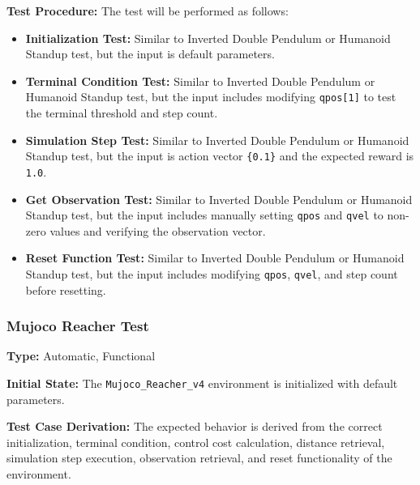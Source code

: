 \documentclass[12pt, titlepage]{article}
\begin{document}
\textbf{Test Procedure:} The test will be performed as follows:
\begin{itemize}
    \item \textbf{Initialization Test:} Similar to Inverted Double Pendulum or Humanoid Standup test, but the input is default parameters.
    
    \item \textbf{Terminal Condition Test:} Similar to Inverted Double Pendulum or Humanoid Standup test, but the input includes modifying \texttt{qpos[1]} to test the terminal threshold and step count.
    
    \item \textbf{Simulation Step Test:} Similar to Inverted Double Pendulum or Humanoid Standup test, but the input is action vector \texttt{\{0.1\}} and the expected reward is \texttt{1.0}.
    
    \item \textbf{Get Observation Test:} Similar to Inverted Double Pendulum or Humanoid Standup test, but the input includes manually setting \texttt{qpos} and \texttt{qvel} to non-zero values and verifying the observation vector.
    
    \item \textbf{Reset Function Test:} Similar to Inverted Double Pendulum or Humanoid Standup test, but the input includes modifying \texttt{qpos}, \texttt{qvel}, and step count before resetting.
\end{itemize}


\subsubsection{Mujoco Reacher Test\\}

\textbf{Type:} Automatic, Functional

\textbf{Initial State:} The \texttt{Mujoco\_Reacher\_v4} environment is initialized with default parameters.

\textbf{Test Case Derivation:} The expected behavior is derived from the correct initialization, terminal condition, control cost calculation, distance retrieval, simulation step execution, observation retrieval, and reset functionality of the environment.
\end{document}
